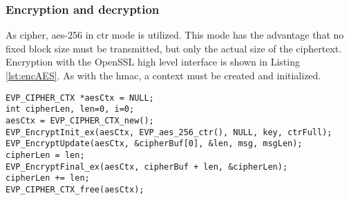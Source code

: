 \subsubsection{Encryption and decryption}
As cipher, \gls{aes}-256 in \gls{ctr} mode is utilized. This mode has the advantage that no fixed block size must be transmitted, but only the actual size of the ciphertext.
Encryption with the OpenSSL high level interface is shown in Listing \ref{lst:encAES}. As with the \gls{hmac}, a context must be created and initialized.

\begin{lstlisting}[style=cStyle,caption={\gls{aes} encryption},label=lst:encAES]
EVP_CIPHER_CTX *aesCtx = NULL;
int cipherLen, len=0, i=0;
aesCtx = EVP_CIPHER_CTX_new();
EVP_EncryptInit_ex(aesCtx, EVP_aes_256_ctr(), NULL, key, ctrFull);
EVP_EncryptUpdate(aesCtx, &cipherBuf[0], &len, msg, msgLen);
cipherLen = len;
EVP_EncryptFinal_ex(aesCtx, cipherBuf + len, &cipherLen);
cipherLen += len;
EVP_CIPHER_CTX_free(aesCtx);
\end{lstlisting}

